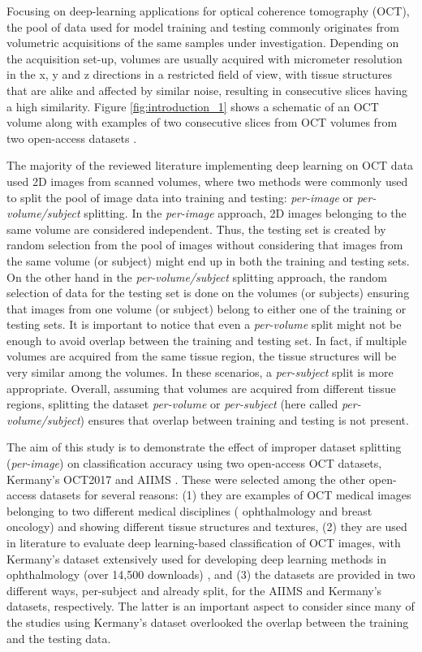 \documentclass[fleqn,10pt]{wlscirep}
\begin{document}
Focusing on deep-learning applications for optical coherence tomography (OCT), the pool of data used for model training and testing commonly originates from volumetric acquisitions of the same samples under investigation. Depending on the acquisition set-up, volumes are usually acquired with micrometer resolution in the x, y and z directions in a restricted field of view, with tissue structures that are alike and affected by similar noise, resulting in consecutive slices having a high similarity. Figure \ref{fig:introduction_1} shows a schematic of an OCT volume along with examples of two consecutive slices from OCT volumes from two open-access datasets \cite{butola2019volumetric, kermany2018large}. 

The majority of the reviewed literature implementing deep learning on OCT data used 2D images from scanned volumes, where two methods were commonly used to split the pool of image data into training and testing: \textit{per-image} or \textit{per-volume/subject} splitting. In the \textit{per-image} approach, 2D images belonging to the same volume are considered independent. Thus, the testing set is created by random selection from the pool of images without considering that images from the same volume (or subject) might end up in both the training and testing sets. On the other hand in the \textit{per-volume/subject} splitting approach, the random selection of data for the testing set is done on the volumes (or subjects) ensuring that images from one volume (or subject) belong to either one of the training or testing sets. It is important to notice that even a \textit{per-volume} split might not be enough to avoid overlap between the training and testing set. In fact, if multiple volumes are acquired from the same tissue region, the tissue structures will be very similar among the volumes. In these scenarios, a \textit{per-subject} split is more appropriate. Overall, assuming that volumes are acquired from different tissue regions, splitting the dataset \textit{per-volume} or \textit{per-subject} (here called \textit{per-volume/subject}) ensures that overlap between training and testing is not present.

The aim of this study is to demonstrate the effect of improper dataset splitting (\textit{per-image}) on classification accuracy using two open-access OCT datasets, Kermany’s OCT2017 \cite{kermany2018large} and AIIMS \cite{butola2019volumetric}. These were selected among the other open-access datasets for several reasons: (1) they are examples of OCT medical images belonging to two different medical disciplines ( ophthalmology and breast oncology) and showing different tissue structures and textures, (2) they are used in literature to evaluate deep learning-based classification of OCT images, with Kermany’s dataset \cite{kermany2018large} extensively used for developing deep learning methods in ophthalmology (over 14,500 downloads) \cite{Retinalkaggle}, and (3) the datasets are provided in two different ways, per-subject and already split, for the AIIMS and Kermany’s datasets, respectively. The latter is an important aspect to consider since many of the studies using Kermany’s dataset overlooked the overlap between the training and the testing data. 
\end{document}
